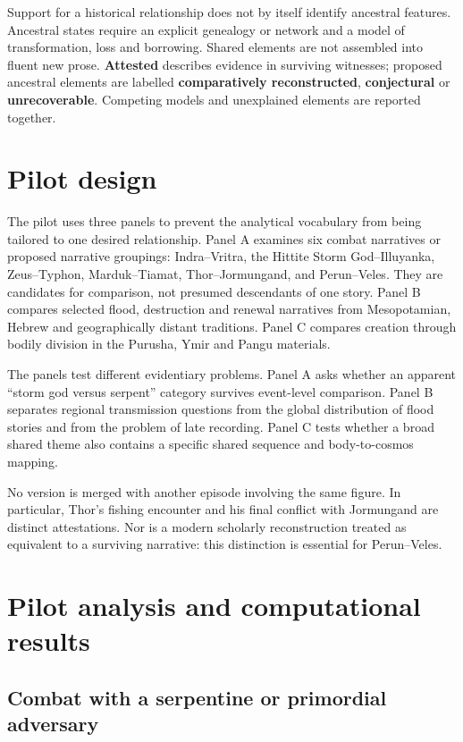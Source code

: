 \documentclass[11pt]{article}
\DeclareRobustCommand{\_}{\textunderscore\allowbreak}
\begin{document}
Support for a historical relationship does not by itself identify ancestral
features. Ancestral states require an explicit genealogy or network and a model
of transformation, loss and borrowing. Shared elements are not assembled into
fluent new prose. \textbf{Attested} describes evidence in surviving witnesses;
proposed ancestral elements are labelled \textbf{comparatively reconstructed},
\textbf{conjectural} or \textbf{unrecoverable}. Competing models and unexplained
elements are reported together.

\section{Pilot design}

The pilot uses three panels to prevent the analytical vocabulary from being
tailored to one desired relationship. Panel A examines six combat narratives or
proposed narrative groupings: Indra--Vritra, the Hittite Storm God--Illuyanka,
Zeus--Typhon, Marduk--Tiamat, Thor--Jormungand, and Perun--Veles. They are
candidates for comparison, not presumed descendants of one story. Panel B
compares selected flood, destruction and renewal narratives from Mesopotamian,
Hebrew and geographically distant traditions. Panel C compares creation through
bodily division in the Purusha, Ymir and Pangu materials.

The panels test different evidentiary problems. Panel A asks whether an apparent
``storm god versus serpent'' category survives event-level comparison. Panel B
separates regional transmission questions from the global distribution of flood
stories and from the problem of late recording. Panel C tests whether a broad
shared theme also contains a specific shared sequence and body-to-cosmos mapping.

No version is merged with another episode involving the same figure. In
particular, Thor's fishing encounter and his final conflict with Jormungand are
distinct attestations. Nor is a modern scholarly reconstruction treated as
equivalent to a surviving narrative: this distinction is essential for
Perun--Veles.

\section{Pilot analysis and computational results}

\subsection{Combat with a serpentine or primordial adversary}
\end{document}
